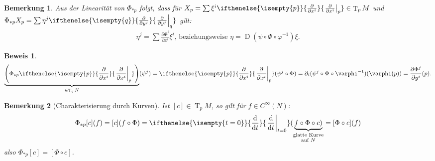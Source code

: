 \documentclass[paper=A4, twoside, chapterprefix=true, bibliography=totoc, headsepline]{scrbook}
\let\temp\phi{}
\let\phi\varphi{}
\let\varphi\temp{}
\let\temp\theta{}
\let\theta\vartheta{}
\let\vartheta\temp{}
\let\temp\epsilon{}
\let\epsilon\varepsilon{}
\let\varepsilon\temp{}
\let\temp\rho{}
\let\rho\varrho{}
\let\varrho\temp{}
\DeclareMathOperator{\D}{D}         %
\DeclareMathOperator{\T}{T}         %
\newcommand{\dop}{\mathrm{d}}
\newcommand{\difffrac}[3][]{\ifthenelse{\isempty{#1}}{\frac{\dop #2}{\dop #3}}{\left. \frac{\dop #2}{\dop #3} \right|_{#1}}}
\newcommand{\pdifffrac}[3][]{\ifthenelse{\isempty{#1}}{\frac{\partial #2}{\partial #3}}{\left. \frac{\partial #2}{\partial #3} \right|_{#1}}}
\theoremstyle{plain}
\theoremstyle{nonumberplain}
\newtheorem{bem}{Bemerkung}
\newtheorem{bew}{Beweis}
\theoremstyle{empty}
\theoremstyle{break}
\begin{document}
\begin{bem}
  Aus der Linearit\"at von $\Phi_{*p}$ folgt, dass f\"ur $X_p = \sum \xi^i\pdifffrac[p]{}{x^i} \in \T_pM$ und $\Phi_{*p}X_p = \sum \eta^j\pdifffrac[q]{}{y^j}$ gilt:
  \begin{align*}
    \eta^j = \sum \frac{\partial \Phi^j}{\partial x^i}\xi^i \text{, beziehungsweise } \eta = \D(\psi \circ \Phi \circ \phi^{-1})\xi.
  \end{align*}
\end{bem}

\begin{bew}
  \begin{align*}
    \underbrace{\left(\Phi_{*p}\pdifffrac[p]{}{x^i}\right)}_{\in \T_qN}(\psi^j) = \pdifffrac[p]{}{x^i}(\psi^j \circ \Phi) = \partial_i (\psi^j \circ \Phi \circ \phi^{-1})(\phi(p)) = \frac{\partial \Phi^j}{\partial y^i}(p).
  \end{align*}
\end{bew}

\begin{bem}[Charakterisierung durch Kurven]
  Ist $[c] \in \T_p M$, so gilt f\"ur $f \in C^{\infty}(N)$:
  \begin{align*}
    \Phi_{*p}[c](f) = [c](f \circ \Phi) = \difffrac[t=0]{}{t}(\underbrace{f \circ \Phi \circ c)}_{\substack{\text{glatte Kurve}\\ \text{auf }N}} = [\Phi \circ c](f)
  \end{align*}
  also $\Phi_{*p}[c] = [\Phi \circ c]$.
\end{bem}
\end{document}
